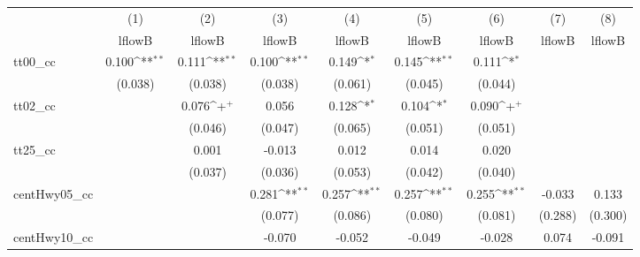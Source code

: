 {
\def\sym#1{\ifmmode^{#1}\else\(^{#1}\)\fi}
\begin{tabular}{l*{8}{c}}
\hline\hline
            &\multicolumn{1}{c}{(1)}&\multicolumn{1}{c}{(2)}&\multicolumn{1}{c}{(3)}&\multicolumn{1}{c}{(4)}&\multicolumn{1}{c}{(5)}&\multicolumn{1}{c}{(6)}&\multicolumn{1}{c}{(7)}&\multicolumn{1}{c}{(8)}\\
            &\multicolumn{1}{c}{lflowB}&\multicolumn{1}{c}{lflowB}&\multicolumn{1}{c}{lflowB}&\multicolumn{1}{c}{lflowB}&\multicolumn{1}{c}{lflowB}&\multicolumn{1}{c}{lflowB}&\multicolumn{1}{c}{lflowB}&\multicolumn{1}{c}{lflowB}\\
\hline
tt00\_cc     &       0.100\sym{**}&       0.111\sym{**}&       0.100\sym{**}&       0.149\sym{*} &       0.145\sym{**}&       0.111\sym{*} &                    &                    \\
            &     (0.038)        &     (0.038)        &     (0.038)        &     (0.061)        &     (0.045)        &     (0.044)        &                    &                    \\
[1em]
tt02\_cc     &                    &       0.076\sym{+} &       0.056        &       0.128\sym{*} &       0.104\sym{*} &       0.090\sym{+} &                    &                    \\
            &                    &     (0.046)        &     (0.047)        &     (0.065)        &     (0.051)        &     (0.051)        &                    &                    \\
[1em]
tt25\_cc     &                    &       0.001        &      -0.013        &       0.012        &       0.014        &       0.020        &                    &                    \\
            &                    &     (0.037)        &     (0.036)        &     (0.053)        &     (0.042)        &     (0.040)        &                    &                    \\
[1em]
centHwy05\_cc&                    &                    &       0.281\sym{**}&       0.257\sym{**}&       0.257\sym{**}&       0.255\sym{**}&      -0.033        &       0.133        \\
            &                    &                    &     (0.077)        &     (0.086)        &     (0.080)        &     (0.081)        &     (0.288)        &     (0.300)        \\
[1em]
centHwy10\_cc&                    &                    &      -0.070        &      -0.052        &      -0.049        &      -0.028        &       0.074        &      -0.091        \\

\end{tabular}}
